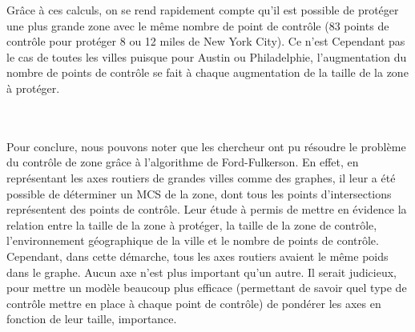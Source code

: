 Grâce à ces calculs, on se rend rapidement compte qu'il est possible de protéger une plus grande zone avec le même nombre de point de contrôle (83 points de contrôle pour protéger 8 ou 12 miles de New York City). Ce n'est Cependant pas le cas de toutes les villes puisque pour Austin ou Philadelphie, l'augmentation du nombre de points de contrôle se fait à chaque augmentation de la taille de la zone à protéger.\\~\\~\\\par
Pour conclure, nous pouvons noter que les chercheur ont pu résoudre le problème du contrôle de zone grâce à l'algorithme de Ford-Fulkerson. En effet, en représentant les axes routiers de grandes villes comme des graphes, il leur a été possible de déterminer un MCS de la zone, dont tous les points d'intersections représentent des points de contrôle. Leur étude à permis de mettre en évidence la relation entre la taille de la zone à protéger, la taille de la zone de contrôle, l'environnement géographique de la ville et le nombre de points de contrôle.\\
Cependant, dans cette démarche, tous les axes routiers avaient le même poids dans le graphe. Aucun axe n'est plus important qu'un autre. Il serait judicieux, pour mettre un modèle beaucoup plus efficace (permettant de savoir quel type de contrôle mettre en place à chaque point de contrôle) de pondérer les axes en fonction de leur taille, importance.